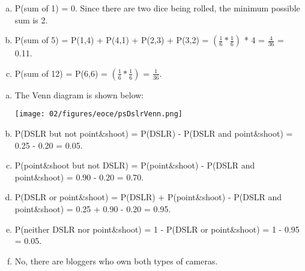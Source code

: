 {
{
\begin{enumerate}[(a)]
\setlength{\itemsep}{0mm}
\item P(sum of 1) = 0. Since there are two dice being rolled, the minimum possible sum is 2.
\item P(sum of 5) = P(1,4) +  P(4,1) + P(2,3) + P(3,2) = $\left( \frac{1}{6} * \frac{1}{6} \right)$ * 4 = $\frac{4}{36}$ =  0.11.
\item P(sum of 12) = P(6,6) = $\left( \frac{1}{6} * \frac{1}{6} \right)$ = $\frac{1}{36}$.
\end{enumerate}
}}


{
{
\begin{enumerate}[(a)]
\setlength{\itemsep}{0mm}
\item The Venn diagram is shown below:
\begin{center}
\texttt{[image: 02/figures/eoce/psDslrVenn.png]}
\end{center}
\item P(DSLR but not point\&shoot) = P(DSLR) - P(DSLR and point\&shoot) = 0.25 - 0.20 = 0.05.
\item P(point\&shoot but not DSLR) = P(point\&shoot) - P(DSLR and point\&shoot) = 0.90 - 0.20 = 0.70.
\item P(DSLR or point\&shoot) = P(DSLR) + P(point\&shoot) - P(DSLR and point\&shoot) = 0.25 + 0.90 - 0.20 = 0.95.
\item P(neither DSLR nor point\&shoot) = 1 - P(DSLR or point\&shoot)  = 1 - 0.95 = 0.05.
\item No, there are bloggers who own both types of cameras.
\end{enumerate}
}\label{cameras}
}

